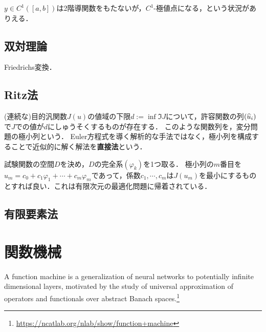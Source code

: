\documentclass[uplatex,dvipdfmx]{jsreport}
\begin{document}
\begin{remark}
    $y\in C^1([a,b])$は2階導関数をもたないが，$C^1$-極値点になる，という状況がありえる．
\end{remark}

\subsection{双対理論}

\begin{tcolorbox}[colframe=ForestGreen, colback=ForestGreen!10!white,breakable,colbacktitle=ForestGreen!40!white,coltitle=black,fonttitle=\bfseries\sffamily,
title=]
    Friedrichs変換．
\end{tcolorbox}

\subsection{Ritz法}

\begin{definition}
    (連続な)目的汎関数$J(u)$の値域の下限$d:=\inf\Im J$について，許容関数の列$(\widehat{u}_i)$で$J$での値が$d$にしゅうそくするものが存在する．
    このような関数列を，変分問題の極小列という．
    Euler方程式を導く解析的な手法ではなく，極小列を構成することで近似的に解く解法を\textbf{直接法}という．
\end{definition}

\begin{example}
    試験関数の空間$D$を決め，$D$の完全系$(\varphi_k)$を1つ取る．
    極小列の$m$番目を$u_m=c_0+c_1\varphi_1+\cdots+c_m\varphi_m$であって，係数$c_1,\cdots,c_m$は$J(u_m)$を最小にするものとすれば良い．これは有限次元の最適化問題に帰着されている．
\end{example}

\subsection{有限要素法}



\section{関数機械}

\begin{tcolorbox}[colframe=ForestGreen, colback=ForestGreen!10!white,breakable,colbacktitle=ForestGreen!40!white,coltitle=black,fonttitle=\bfseries\sffamily,
title=]
A function machine is a generalization of neural networks to potentially infinite dimensional layers, motivated by the study of universal approximation of operators and functionals over abstract Banach spaces.\footnote{\url{https://ncatlab.org/nlab/show/function+machine}}
\end{tcolorbox}
\end{document}
